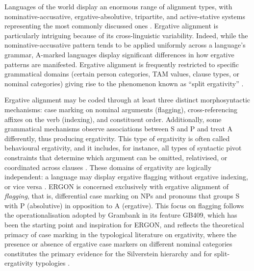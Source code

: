 \documentclass[12pt,a4paper]{article}
\begin{document}
Languages of the world display an enormous range of alignment types, with nominative-accusative, ergative-absolutive, tripartite, and active-stative systems representing the most commonly discussed ones \cite{witzlackmakarevich2019}. Ergative alignment is particularly intriguing because of its cross-linguistic variability. Indeed, while the nominative-accusative pattern tends to be applied uniformly across a language's grammar, A-marked languages display significant differences in how ergative patterns are manifested. Ergative alignment is frequently restricted to specific grammatical domains (certain person categories, TAM values, clause types, or nominal categories) giving rise to the phenomenon known as ``split ergativity'' \cite{dixon1994,silverstein1976}.

Ergative alignment may be coded through at least three distinct morphosyntactic mechanisms: case marking on nominal arguments (flagging), cross-referencing affixes on the verb (indexing), and constituent order. Additionally, some grammatical mechanisms observe associations between S and P and treat A differently, thus producing ergativity. This type of ergativity is often called behavioural ergativity, and it includes, for instance, all types of syntactic pivot constraints that determine which argument can be omitted, relativised, or coordinated across clauses \cite{dixon1994,manning1996}. These domains of ergativity are logically independent: a language may display ergative flagging without ergative indexing, or vice versa \cite{siewierska2005}. ERGON is concerned exclusively with ergative alignment of \textit{flagging}, that is, differential case marking on NPs and pronouns that groups S with P (absolutive) in opposition to A (ergative). This focus on flagging follows the operationalisation adopted by Grambank \cite{grambank2023} in its feature GB409, which has been the starting point and inspiration for ERGON, and reflects the theoretical primacy of case marking in the typological literature on ergativity, where the presence or absence of ergative case markers on different nominal categories constitutes the primary evidence for the Silverstein hierarchy \cite{silverstein1976} and for split-ergativity typologies \cite{dixon1994,givon2001}.
\end{document}
